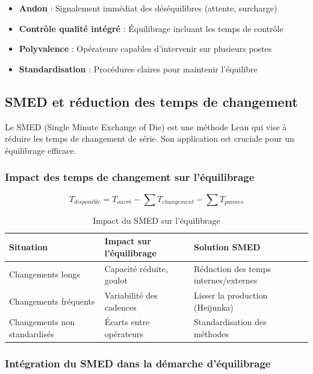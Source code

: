 \documentclass[12pt,a4paper]{article}
\newenvironment{methodbox}[1]
  {\begin{tcolorbox}[colback=blue!5!white, colframe=methodcolor, title=#1]\small}
  {\end{tcolorbox}}
\begin{document}
\begin{methodbox}{Lien entre Jidoka et équilibrage}
\begin{itemize}
    \item \textbf{Andon} : Signalement immédiat des déséquilibres (attente, surcharge)
    \item \textbf{Contrôle qualité intégré} : Équilibrage incluant les temps de contrôle
    \item \textbf{Polyvalence} : Opérateurs capables d'intervenir sur plusieurs postes
    \item \textbf{Standardisation} : Procédures claires pour maintenir l'équilibre
\end{itemize}
\end{methodbox}

\subsection{SMED et réduction des temps de changement}

Le SMED (Single Minute Exchange of Die) est une méthode Lean qui vise à réduire les temps de changement de série. Son application est cruciale pour un équilibrage efficace.

\subsubsection{Impact des temps de changement sur l'équilibrage}

\[
\boxed{T_{disponible} = T_{ouvré} - \sum T_{changement} - \sum T_{pannes}}
\]

\begin{table}[H]
\centering
\begin{tabular}{|p{4cm}|p{5cm}|p{4cm}|}
\hline
\textbf{Situation} & \textbf{Impact sur l'équilibrage} & \textbf{Solution SMED} \\
\hline
Changements longs & Capacité réduite, goulot & Réduction des temps internes/externes \\
\hline
Changements fréquents & Variabilité des cadences & Lisser la production (Heijunka) \\
\hline
Changements non standardisés & Écarts entre opérateurs & Standardisation des méthodes \\
\hline
\end{tabular}
\caption{Impact du SMED sur l'équilibrage}
\end{table}

\subsubsection{Intégration du SMED dans la démarche d'équilibrage}
\end{document}
